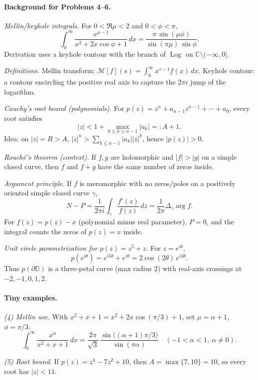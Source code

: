 \documentclass[11pt,a4paper]{article}
\theoremstyle{definition}
\theoremstyle{definition}
\theoremstyle{plain}
\theoremstyle{remark}
\DeclareMathOperator{\Log}{Log}
\begin{document}
\paragraph{Background for Problems 4--6.}

\emph{Mellin/keyhole integrals.}
For $0<\Re\mu<2$ and $0<\phi<\pi$,
\[
\int_{0}^{\infty}\frac{x^{\mu-1}}{x^{2}+2x\cos\phi+1}\,dx
=\frac{\pi\,\sin(\mu\phi)}{\sin(\pi\mu)\,\sin\phi}.
\]
Derivation uses a keyhole contour with the branch of $\Log$ on $\mathbb C\setminus(-\infty,0]$.

\smallskip
\emph{Definitions.}
Mellin transform: $\mathcal M[f](s)=\int_{0}^{\infty}x^{s-1}f(x)\,dx$.
Keyhole contour: a contour encircling the positive real axis to capture the $2\pi i$ jump of the logarithm.

\medskip
\emph{Cauchy’s root bound (polynomials).}
For $p(z)=z^{n}+a_{n-1}z^{n-1}+\cdots+a_0$, every root satisfies
\[
|z|<1+\max_{0\le k\le n-1}|a_k|=:A+1.
\]
Idea: on $|z|=R>A$, $|z|^{n}>\sum_{k\le n-1}|a_k||z|^{k}$, hence $|p(z)|>0$.

\smallskip
\emph{Rouché’s theorem (context).}
If $f,g$ are holomorphic and $|f|>|g|$ on a simple closed curve, then $f$ and $f+g$ have the same number of zeros inside.

\medskip
\emph{Argument principle.}
If $f$ is meromorphic with no zeros/poles on a positively oriented simple closed curve $\gamma$,
\[
N-P=\frac{1}{2\pi i}\int_{\gamma}\frac{f'(z)}{f(z)}\,dz=\frac{1}{2\pi}\Delta_{\gamma}\arg f.
\]
For $f(z)=p(z)-x$ (polynomial minus real parameter), $P=0$, and the integral counts the zeros of $p(z)=x$ inside.

\smallskip
\emph{Unit circle parametrization for $p(z)=z^5+z$.}
For $z=e^{i\theta}$,
\[
p(e^{i\theta})=e^{i5\theta}+e^{i\theta}
=2\cos(2\theta)\,e^{i3\theta}.
\]
Thus $p(\partial\mathbb D)$ is a three-petal curve (max radius $2$) with real-axis crossings at $-2,-1,0,1,2$.

\medskip
\paragraph{Tiny examples.}

\emph{(4) Mellin use.}
With $x^{2}+x+1=x^{2}+2x\cos(\pi/3)+1$, set $\mu=\alpha+1$, $\phi=\pi/3$:
\[
\int_{0}^{\infty}\frac{x^{\alpha}}{x^{2}+x+1}\,dx
=\frac{2\pi}{\sqrt3}\,\frac{\sin\!\big((\alpha+1)\pi/3\big)}{\sin(\pi\alpha)}
\quad(-1<\alpha<1,\ \alpha\neq 0).
\]

\smallskip
\emph{(5) Root bound.}
If $p(z)=z^{4}-7z^{2}+10$, then $A=\max\{7,10\}=10$, so every root has $|z|<11$.
\end{document}
